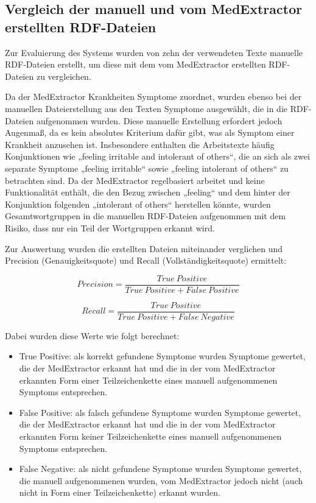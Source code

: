 

\subsection{Vergleich der manuell und vom MedExtractor erstellten RDF-Dateien}
\label{subsec:RDF-Vergleich} 

Zur Evaluierung des Systems wurden von zehn der verwendeten Texte manuelle RDF-Dateien erstellt, um diese mit dem vom MedExtractor erstellten RDF-Dateien zu vergleichen. 

Da der MedExtractor Krankheiten Symptome zuordnet, wurden ebenso bei der manuellen Dateierstellung aus den Texten Symptome ausgewählt, die in die RDF-Dateien aufgenommen wurden. Diese manuelle Erstellung erfordert jedoch Augenmaß, da es kein absolutes Kriterium dafür gibt, was als Symptom einer Krankheit anzusehen ist. Insbesondere enthalten die Arbeitstexte häufig Konjunktionen wie „feeling irritable and intolerant of others“, die an sich als zwei separate Symptome „feeling irritable“ sowie „feeling intolerant of others“ zu betrachten sind. Da der MedExtractor regelbasiert arbeitet und keine Funktionalität enthält, die den Bezug zwischen „feeling“ und dem hinter der Konjunktion folgenden „intolerant of others“ herstellen könnte, wurden Gesamtwortgruppen in die manuellen RDF-Dateien aufgenommen mit dem Risiko, dass nur ein Teil der Wortgruppen erkannt wird.

Zur Auswertung wurden die erstellten Dateien miteinander verglichen und Precision (Genauigkeitsquote) und Recall (Vollständigkeitsquote) ermittelt:

\[ Precision = \frac{True\ Positive}{True\ Positive + False\ Positive} \]

\[ Recall = \frac{True\ Positive}{True\ Positive + False\ Negative} \]

Dabei wurden diese Werte wie folgt berechnet:
\begin{itemize}
\item True Positive: als korrekt gefundene Symptome wurden Symptome gewertet, die der MedExtractor erkannt hat und die in der vom MedExtractor erkannten Form einer Teilzeichenkette eines manuell aufgenommenen Symptoms entsprechen. 
\item False Positive: als falsch gefundene Symptome wurden Symptome gewertet, die der MedExtractor erkannt hat und die in der vom MedExtractor erkannten Form keiner Teilzeichenkette eines manuell aufgenommenen Symptoms entsprechen.
\item False Negative: als nicht gefundene Symptome wurden Symptome gewertet, die manuell aufgenommenen wurden, vom MedExtractor jedoch nicht (auch nicht in Form einer Teilzeichenkette) erkannt wurden.
\end{itemize}



